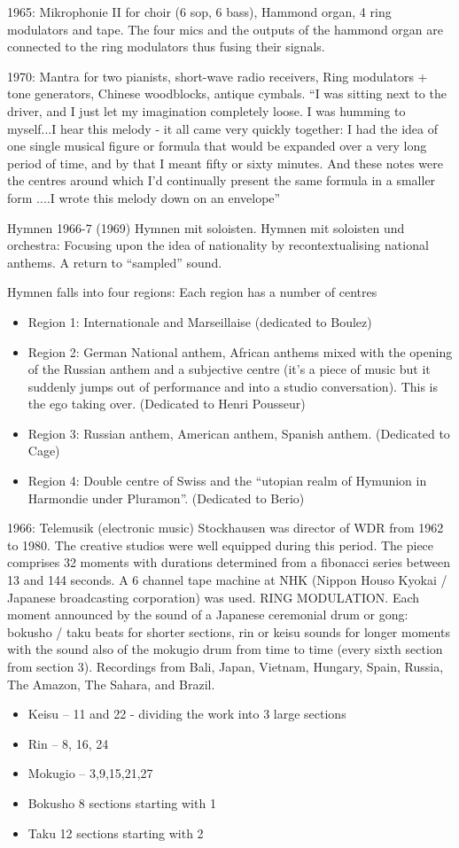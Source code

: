 1965: Mikrophonie II for choir (6 sop, 6 bass), Hammond organ, 4 ring modulators and tape. The four mics and the outputs of the hammond organ are connected to the ring modulators thus fusing their signals.

1970: Mantra for two pianists, short-wave radio receivers, Ring modulators + tone generators, Chinese woodblocks, antique cymbals. ``I was sitting next to the driver, and I just let my imagination completely loose. I was humming to myself...I hear this melody - it all came very quickly together: I had the idea of one single musical figure or formula that would be expanded over a very long period of time, and by that I meant fifty or sixty minutes. And these notes were the centres around which I'd continually present the same
formula in a smaller form ....I wrote this melody down on an envelope''

Hymnen 1966-7 (1969) Hymnen mit soloisten. Hymnen mit soloisten und orchestra: Focusing upon the idea of nationality by recontextualising national anthems. A return to ``sampled'' sound.

Hymnen falls into four regions: Each region has a number of centres
\begin{itemize}
\item Region 1: Internationale and Marseillaise (dedicated to Boulez) 
\item Region 2: German National anthem, African anthems mixed with the opening of the Russian anthem and a subjective centre (it's a piece of music but it suddenly jumps out of performance and into a studio conversation). This is the ego taking over. (Dedicated to Henri Pousseur)
\item Region 3: Russian anthem, American anthem, Spanish anthem. (Dedicated to Cage)
\item Region 4: Double centre of Swiss and the ``utopian realm of Hymunion in Harmondie under Pluramon''. (Dedicated to Berio)
\end{itemize}

1966: Telemusik (electronic music) Stockhausen was director of WDR from 1962 to 1980. The creative studios were well equipped during this period. The piece comprises 32 moments with durations determined from a fibonacci series between 13 and 144 seconds. A 6 channel tape machine at NHK (Nippon Houso Kyokai / Japanese broadcasting corporation) was used. RING MODULATION. Each moment announced by the sound of a Japanese ceremonial drum or gong: bokusho / taku beats for shorter sections, rin or keisu sounds for longer moments
with the sound also of the mokugio drum from time to time (every sixth section from section 3). Recordings from Bali, Japan, Vietnam, Hungary, Spain, Russia, The Amazon, The Sahara, and Brazil.
\begin{itemize}
\item Keisu – 11 and 22 - dividing the work into 3 large sections
\item Rin – 8, 16, 24
\item Mokugio – 3,9,15,21,27
\item Bokusho 8 sections starting with 1
\item Taku 12 sections starting with 2
\end{itemize}

